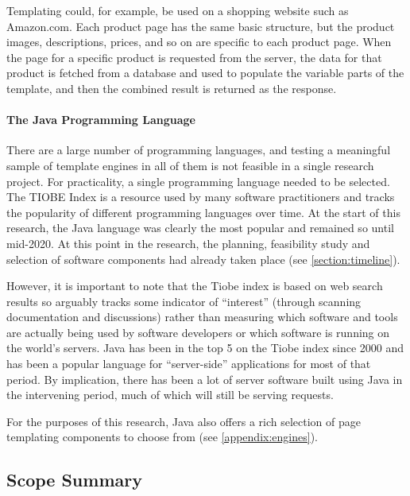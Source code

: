 Templating could, for example, be used on a shopping website such as Amazon.com. Each product page has the same basic structure, but the product images, descriptions, prices, and so on are specific to each product page. When the page for a specific product is requested from the server, the data for that product is fetched from a database and used to populate the variable parts of the template, and then the combined result is returned as the response.

\paragraph{The Java Programming Language}

There are a large number of \gls{programming language}s, and testing a meaningful sample of \gls{template engine}s in all of them is not feasible in a single research project. For practicality, a single \gls{programming language} needed to be selected. The TIOBE Index \citep{Tiobe2024} is a resource used by many software practitioners and tracks the popularity of different \gls{programming language}s over time. At the start of this research, the Java language was clearly the most popular and remained so until mid-2020. At this point in the research, the planning, feasibility study and selection of software components had already taken place (see \autoref{section:timeline}).

However, it is important to note that the Tiobe index is based on web search results \citep{Tiobe2025} so arguably tracks some indicator of \enquote{interest} (through scanning documentation and discussions) rather than measuring which software and tools are actually being used by software developers or which software is running on the world's servers. Java has been in the top 5 on the Tiobe index since 2000 \citep{Tiobe2024} and has been a popular language for \enquote{server-side} applications for most of that period. By implication, there has been a lot of server software built using Java in the intervening period, much of which will still be serving requests.

For the purposes of this research, Java also offers a rich selection of page templating components to choose from (see \autoref{appendix:engines}).

\subsection{Scope Summary}
\label{scope:summary}

